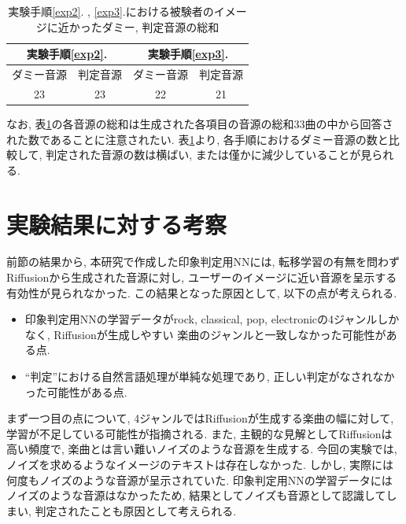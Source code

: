 \documentclass[a4paper,11pt,dvipdfmx]{jreport}
\begin{document}
\begin{table}[htb]
  \caption{実験手順\ref{exp2}. , \ref{exp3}.における被験者のイメージに近かったダミー, 判定音源の総和}
    \label{table}
    \vspace{2mm}
    \begin{center}
        \begin{tabular}{|c|c|c|c|}
            \hline
            \multicolumn{2}{|c|}{実験手順\ref{exp2}.}&\multicolumn{2}{|c|}{実験手順\ref{exp3}.}\\
            \hline
            ダミー音源 & 判定音源 & ダミー音源 & 判定音源\\
            \hline
            23 & 23 & 22 & 21\\
            \hline
        \end{tabular}
        \end{center}
\end{table}

なお, 表\ref{table}の各音源の総和は生成された各項目の音源の総和33曲の中から回答された数であることに注意されたい.
表\ref{table}より, 各手順におけるダミー音源の数と比較して, 判定された音源の数は横ばい, または僅かに減少していることが見られる.

\section{実験結果に対する考察}
前節の結果から, 本研究で作成した印象判定用NNには, 転移学習の有無を問わずRiffusionから生成された音源に対し, ユーザーのイメージに近い音源を呈示する有効性が見られなかった.
この結果となった原因として, 以下の点が考えられる.
\begin{itemize}
  \item 印象判定用NNの学習データがrock, classical, pop, 
        electronicの4ジャンルしかなく, Riffusionが生成しやすい
        楽曲のジャンルと一致しなかった可能性がある点.
  \item ``判定''における自然言語処理が単純な処理であり, 正しい判定がなされなかった可能性がある点.
\end{itemize}

まず一つ目の点について, 4ジャンルではRiffusionが生成する楽曲の幅に対して, 学習が不足している可能性が指摘される.
また, 主観的な見解としてRiffusionは高い頻度で, 楽曲とは言い難いノイズのような音源を生成する. 
今回の実験では, ノイズを求めるようなイメージのテキストは存在しなかった.
しかし, 実際には何度もノイズのような音源が呈示されていた.
印象判定用NNの学習データにはノイズのような音源はなかったため, 結果としてノイズも音源として認識してしまい, 判定されたことも原因として考えられる.
\end{document}
